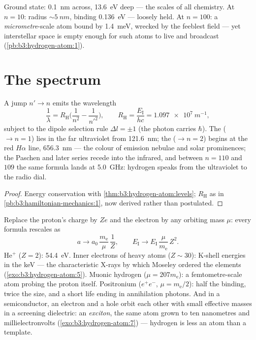 \begin{example}\label{ex:b3:hydrogen-atom:sizes}
Ground state: \qty{0.1}{nm} across, \qty{13.6}{eV} deep --- the
scales of all chemistry. At $n = 10$: radius $\sim\qty{5}{nm}$,
binding \qty{0.136}{eV} --- loosely held. At $n = 100$: a
\emph{micrometre}-scale atom bound by \qty{1.4}{meV}, wrecked by the
feeblest field --- yet interstellar space is empty enough for such
atoms to live and broadcast
(\cref{pb:b3:hydrogen-atom:1}).
\end{example}

\section{The spectrum}

\begin{proposition}\label{prop:b3:hydrogen-atom:series}
A jump $n' \to n$ emits the wavelength
\[
\frac{1}{\lambda} = R_{\text{H}}\Big(\frac{1}{n^2} -
\frac{1}{n'^2}\Big) , \qquad
R_{\text{H}} = \frac{E_{\text{I}}}{hc} = \qty{1.097e7}{m^{-1}} ,
\]
subject to the dipole selection rule $\Delta l = \pm1$ (the photon
carries $\hbar$). The  ($\to n = 1$) lies in the far
ultraviolet from \qty{121.6}{nm}; the  ($\to n = 2$)
begins at the red $H\alpha$ line, \qty{656.3}{nm} --- the colour of
emission nebulae and solar prominences; the Paschen and later series
recede into the infrared, and between $n = 110$ and $109$ the same
formula lands at \qty{5.0}{GHz}: hydrogen speaks from the
ultraviolet to the radio dial.
\end{proposition}

\begin{proof}
Energy conservation with \cref{thm:b3:hydrogen-atom:levels};
$R_{\text{H}}$ as in \cref{pb:b3:hamiltonian-mechanics:1}, now
derived rather than postulated.
\end{proof}

\begin{example}\label{ex:b3:hydrogen-atom:scaling}
Replace the proton's charge by $Ze$ and the electron by any orbiting
mass $\mu$: every formula rescales as
\[
a \to a_0\,\frac{m_{\text{e}}}{\mu}\,\frac1Z , \qquad
E_{\text{I}} \to E_{\text{I}}\,\frac{\mu}{m_{\text{e}}}\,Z^2 .
\]
He$^+$ ($Z = 2$): \qty{54.4}{eV}. Inner electrons of heavy atoms
($Z \sim 30$): K-shell energies in the keV --- the characteristic
X-rays by which Moseley ordered the elements
(\cref{exo:b3:hydrogen-atom:5}). Muonic hydrogen ($\mu = 207
m_{\text{e}}$): a femtometre-scale atom probing the proton itself.
Positronium ($e^+e^-$, $\mu = m_{\text{e}}/2$): half the binding,
twice the size, and a short life ending in annihilation photons.
And in a semiconductor, an electron and a hole orbit each other
with small effective masses in a screening dielectric: an
\emph{exciton}, the same atom grown to ten nanometres and
millielectronvolts (\cref{exo:b3:hydrogen-atom:7}) --- hydrogen is
less an atom than a template.
\end{example}

